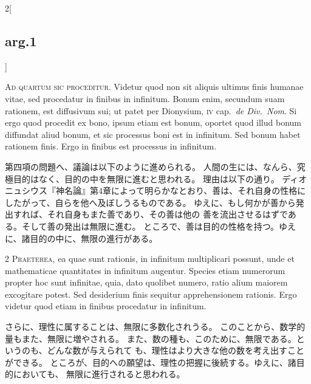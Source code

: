 \documentclass[paper=a4paper,fontsize=10pt,jafontsize=9pt,titlepage]{jlreq}
\begin{document}
\begin{paracol}{2}[\subsection{arg.1}]

{\Huge A}{\scshape d quartum sic proceditur}. Videtur quod non sit
aliquis ultimus finis humanae vitae, sed procedatur in finibus in
infinitum. Bonum enim, secundum suam rationem, est diffusivum sui; ut
patet per Dionysium, {\scshape iv} cap.~{\itshape de Div.~Nom}. Si ergo
quod procedit ex bono, ipsum etiam est bonum, oportet quod illud bonum
diffundat aliud bonum, et sic processus boni est in infinitum. Sed bonum
habet rationem finis. Ergo in finibus est processus in infinitum.

\switchcolumn

第四項の問題へ、議論は以下のように進められる。
人間の生には、なんら、究極目的はなく、目的の中を無限に進むと思われる。
理由は以下の通り。
ディオニュシウス『神名論』第4章によって明らかなとおり、善は、それ自身の性格に
 したがって、自らを他へ及ぼしうるものである。
ゆえに、もし何かが善から発出すれば、それ自身もまた善であり、その善は他の
 善を流出させるはずである。そして善の発出は無限に進む。
ところで、善は目的の性格を持つ。ゆえに、諸目的の中に、無限の進行がある。


{\scshape 2 Praeterea}, ea quae sunt rationis, in
infinitum multiplicari possunt, unde et mathematicae quantitates in
infinitum augentur. Species etiam numerorum propter hoc sunt infinitae,
quia, dato quolibet numero, ratio alium maiorem excogitare potest. Sed
desiderium finis sequitur apprehensionem rationis. Ergo videtur quod
etiam in finibus procedatur in infinitum.

\switchcolumn

さらに、理性に属することは、無限に多数化されうる。
このことから、数学的量もまた、無限に増やされる。
また、数の種も、このために、無限である。というのも、どんな数が与えられて
 も、理性はより大きな他の数を考え出すことができる。
ところが、目的への願望は、理性の把握に後続する。ゆえに、諸目的においても、
 無限に進行されると思われる。



\end{paracol}
\end{document}
